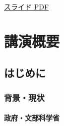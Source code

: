 \documentclass[
]{book}
\theoremstyle{definition}
\theoremstyle{definition}
\theoremstyle{definition}
\theoremstyle{definition}
\theoremstyle{remark}
\begin{document}
\href{https://icu-hsuzuki.github.io/datascience/ed/msj2019.pdf}{スライド PDF}

\hypertarget{ux8b1bux6f14ux6982ux8981}{%
\section{講演概要}\label{ux8b1bux6f14ux6982ux8981}}

\hypertarget{ux306fux3058ux3081ux306b}{%
\subsection{はじめに}\label{ux306fux3058ux3081ux306b}}

\hypertarget{ux80ccux666fux73feux72b6}{%
\subsubsection{背景・現状}\label{ux80ccux666fux73feux72b6}}

\hypertarget{ux653fux5e9cux6587ux90e8ux79d1ux5b66ux7701}{%
\paragraph{政府・文部科学省}\label{ux653fux5e9cux6587ux90e8ux79d1ux5b66ux7701}}
\end{document}
